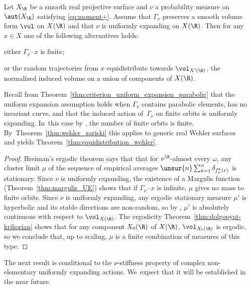\begin{thm}
Let $X_\R$ be a smooth
real projective surface and $\nu$ a probability measure on $\aut(X_\R)$ satisfying \eqref{eq:moment+}.
Assume that $\Gamma_\nu$ preserves a smooth volume form $\vol$ on $X(\R)$ and that $\nu$ is uniformly
expanding on $X(\R)$. Then for any $x\in X$ one of the following alternatives holds:
\begin{enumeratea}
\item either $\Gamma_\nu\cdot x$ is finite;
\item or the random trajectories from $x$ equidistribute
towards $\vol_{X'(\R)}$, the normalized induced volume on a
union of components of $X(\R)$.
\end{enumeratea}
\end{thm}

Recall from Theorem~\ref{thm:criterion_uniform_expansion_parabolic} that the uniform expansion assumption
holds when $\Gamma_\nu$
contains parabolic elements, has no invariant curve, and that the induced
action of~$\Gamma_\nu$ on finite orbits is uniformly expanding. In~this case by \cite[Th.\,C]{finite_orbits},
the number of finite orbits is finite. By~Theorem~\ref{thm:wehler_zariski} this applies to generic real Wehler
surfaces and yields Theorem~\ref{thm:equidistribution_wehler}.

\begin{proof}
Breiman's ergodic theorem says that that for $\nu^\N$-almost every $\omega$, any cluster limit $\mu$
of the sequence of empirical averages $\unsur{n} \sum_{k=1}^n \delta_{f_\omega^k(x)}$ is stationary.
Since $\nu$ is uniformly expanding, the existence of a Margulis function (Theorem~\ref{thm:margulis_UE}) shows that if $\Gamma_\nu\cdot x$ is infinite, $\mu$ gives no mass to finite orbits.
Since $\nu$ is uniformly expanding, any ergodic stationary measure $\mu'$ is hyperbolic and its stable directions are non-random, so by \cite[Th.\,3.4]{br}, $\mu'$ is absolutely continuous with respect to $\vol_{X(\R)}$. The ergodicity
Theorem~\ref{thm:dolgopyat-krikorian} shows that for any component $X_0(\R)$ of $X(\R)$, $\vol_{X_0(\R)}$ is ergodic, so
we conclude that, up to scaling, $\mu$ is a finite combination of measures of this type.
\end{proof}

The next result is conditional to the $\nu$-stiffness property of
complex non-elementary uniformly expanding actions. We~expect that
it will be established in the near future.


